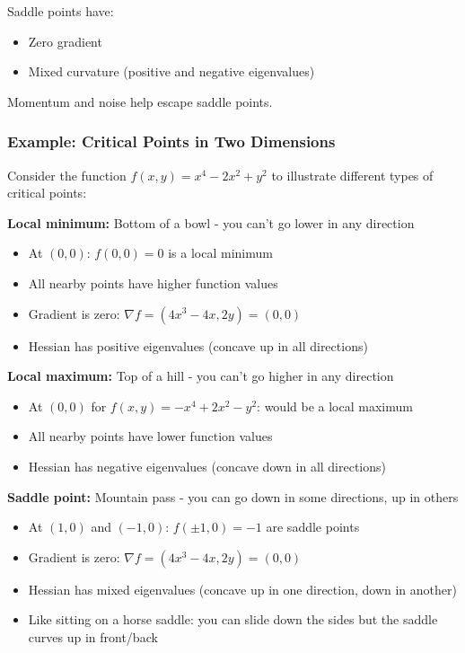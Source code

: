 Saddle points have:
\begin{itemize}
    \item Zero gradient
    \item Mixed curvature (positive and negative eigenvalues)
\end{itemize}

Momentum and noise help escape saddle points.

\subsubsection{Example: Critical Points in Two Dimensions}

Consider the function $f(x,y) = x^4 - 2x^2 + y^2$ to illustrate different types of critical points:

\textbf{Local minimum:} Bottom of a bowl - you can't go lower in any direction
\begin{itemize}
    \item At $(0,0)$: $f(0,0) = 0$ is a local minimum
    \item All nearby points have higher function values
    \item Gradient is zero: $\nabla f = (4x^3 - 4x, 2y) = (0,0)$
    \item Hessian has positive eigenvalues (concave up in all directions)
\end{itemize}

\textbf{Local maximum:} Top of a hill - you can't go higher in any direction
\begin{itemize}
    \item At $(0,0)$ for $f(x,y) = -x^4 + 2x^2 - y^2$: would be a local maximum
    \item All nearby points have lower function values
    \item Hessian has negative eigenvalues (concave down in all directions)
\end{itemize}

\textbf{Saddle point:} Mountain pass - you can go down in some directions, up in others
\begin{itemize}
    \item At $(1,0)$ and $(-1,0)$: $f(\pm 1,0) = -1$ are saddle points
    \item Gradient is zero: $\nabla f = (4x^3 - 4x, 2y) = (0,0)$
    \item Hessian has mixed eigenvalues (concave up in one direction, down in another)
    \item Like sitting on a horse saddle: you can slide down the sides but the saddle curves up in front/back
\end{itemize}

